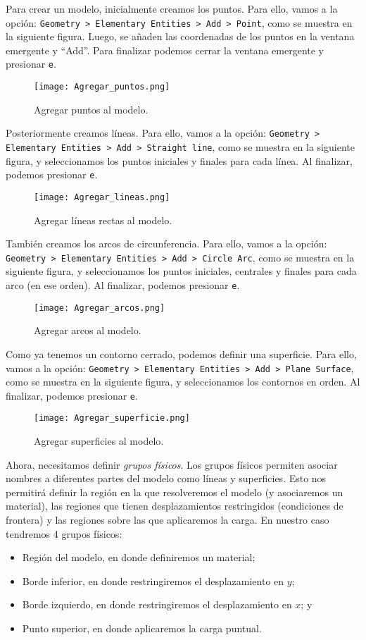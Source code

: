 Para crear un modelo, inicialmente creamos los puntos. Para ello, vamos a la opción: \texttt{Geometry > Elementary Entities > Add > Point}, como se muestra en la siguiente figura. Luego, se añaden las coordenadas de los puntos en la ventana emergente y ``Add''. Para finalizar podemos cerrar la ventana emergente y presionar \texttt{e}.
\begin{figure}[H]
    \centering
    \texttt{[image: Agregar\_puntos.png]}
    \caption{Agregar puntos al modelo.}
\end{figure}

Posteriormente creamos líneas. Para ello, vamos a la opción: \texttt{Geometry > Elementary Entities > Add > Straight line}, como se muestra en la siguiente figura, y seleccionamos los puntos iniciales y finales para cada línea. Al finalizar, podemos presionar \texttt{e}.
\begin{figure}[H]
    \centering
    \texttt{[image: Agregar\_lineas.png]}
    \caption{Agregar líneas rectas al modelo.}
\end{figure}

También creamos los arcos de circunferencia. Para ello, vamos a la opción: \texttt{Geometry > Elementary Entities > Add > Circle Arc}, como se muestra en la siguiente figura, y seleccionamos los puntos iniciales, centrales y finales para cada arco (en ese orden). Al finalizar, podemos presionar \texttt{e}.
\begin{figure}[H]
    \centering
    \texttt{[image: Agregar\_arcos.png]}
    \caption{Agregar arcos al modelo.}
\end{figure}

Como ya tenemos un contorno cerrado, podemos definir una superficie. Para ello, vamos a la opción: \texttt{Geometry > Elementary Entities > Add > Plane Surface}, como se muestra en la siguiente figura, y seleccionamos los contornos en orden. Al finalizar, podemos presionar \texttt{e}.
\begin{figure}[H]
    \centering
    \texttt{[image: Agregar\_superficie.png]}
    \caption{Agregar superficies al modelo.}
\end{figure}

Ahora, necesitamos definir \emph{grupos físicos}. Los grupos físicos permiten asociar nombres a diferentes partes del modelo como líneas y superficies. Esto nos permitirá definir la región en la que resolveremos el modelo (y asociaremos un material), las regiones que tienen desplazamientos restringidos (condiciones de frontera) y las regiones sobre las que aplicaremos la carga. En nuestro caso tendremos 4 grupos físicos:
\begin{itemize}
    \item Región del modelo, en donde definiremos un material;
    \item Borde inferior, en donde restringiremos el desplazamiento en $y$;
    \item Borde izquierdo, en donde restringiremos el desplazamiento en $x$; y
    \item Punto superior, en donde aplicaremos la carga puntual.
\end{itemize}


